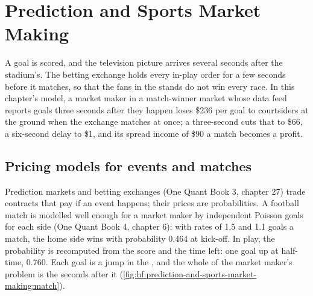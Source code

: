 \chapter{Prediction and Sports Market Making}\label{ch:hf:prediction-and-sports-market-making}

A goal is scored, and the television picture arrives several seconds after the stadium's. The betting exchange holds every in-play order for a few
seconds before it matches, so that the fans in the stands do not win every race. In this chapter's model, a market maker in a match-winner market
whose data feed reports goals three seconds after they happen loses \$236 per goal to courtsiders at the ground when the exchange matches at once;
a three-second  cuts that to \$66, a six-second delay to \$1, and its spread income of \$90 a match becomes a profit.

\section{Pricing models for events and matches}

Prediction markets and betting exchanges (One Quant Book 3, chapter 27) trade contracts that pay if an event happens; their prices are
probabilities. A football match is modelled well enough for a market maker by independent Poisson goals for each side (One Quant Book 4, chapter
6): with rates of 1.5 and 1.1 goals a match, the home side wins with probability 0.464 at kick-off. In play, the probability is recomputed from the
score and the time left: one goal up at half-time, 0.760. Each goal is a jump in the , and the whole of the market maker's problem is
the seconds after it (\cref{fig:hf:prediction-and-sports-market-making:match}).

\begin{omfigure}

\label{fig:hf:prediction-and-sports-market-making:match}
\end{omfigure}

